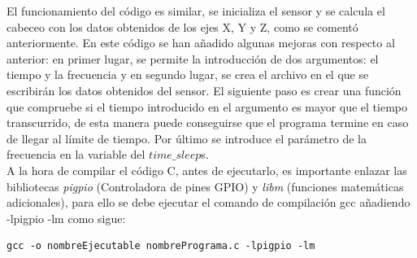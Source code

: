El funcionamiento del código es similar, se inicializa el sensor y se calcula el cabeceo con los datos obtenidos de los ejes X, Y y Z, como se comentó anteriormente. En este código se han añadido algunas mejoras con respecto al anterior: en primer lugar, se permite la introducción de dos argumentos: el tiempo y la frecuencia y en segundo lugar, se crea el archivo en el que se escribirán los datos obtenidos del sensor. El siguiente paso es crear una función que compruebe si el tiempo introducido en el argumento es mayor que el tiempo transcurrido, de esta manera puede conseguirse que el programa termine en caso de llegar al límite de tiempo. Por último se introduce el parámetro de la frecuencia en la variable del $time\_sleep$s.\\

A la hora de compilar el código C, antes de ejecutarlo, es importante enlazar las bibliotecas \textit{pigpio} (Controladora de pines GPIO) y \textit{libm} (funciones matemáticas adicionales), para ello se debe ejecutar el comando de compilación gcc añadiendo -lpigpio -lm como sigue:\\
\begin{lstlisting}[style=terminal]
gcc -o nombreEjecutable nombrePrograma.c -lpigpio -lm
\end{lstlisting}

